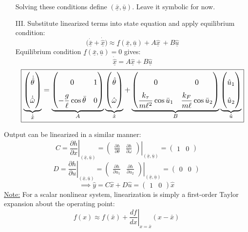 \documentclass[10pt, fleqn]{article}
\begin{document}
\begin{multicols*}{2}
\begin{itemize}
    Solving these conditions define $(\underline{\bar{x}}, \underline{\bar{u}})$. Leave it symbolic for now.
    \item [III.] Substitute linearized terms into state equation and apply equilibrium condition:
    \[\big(\underline{\dot{\bar{x}}}+\underline{\dot{\hat{x}}}\big)\approx \underline{f}(\underline{{\bar{x}}},\underline{\bar{u}})+ A \underline{\hat{x}}\ + B \underline{\hat{u}}\]
    Equilibrium condition $\underline{f}(\underline{{\bar{x}}},\underline{\bar{u}}) = 0$ gives:
    \[\underline{\dot{\hat{x}}} = A \underline{\hat{x}} + B \underline{\hat{u}}\]
\[
\resizebox{0.95\columnwidth}{!}{$\displaystyle
\renewcommand{\arraystretch}{2}
\boxed{
\underbrace{
\begin{pmatrix}
\dot{\hat{\theta}} \\
\dot{\hat{\omega}}
\end{pmatrix}
}_{\dot{\hat{x}}}
=
\underbrace{
\begin{pmatrix}
0 & 1 \\
-\dfrac{g}{\ell}\cos\bar{\theta} & 0
\end{pmatrix}
}_{A}
\underbrace{
\begin{pmatrix}
\hat{\theta} \\
\hat{\omega}
\end{pmatrix}
}_{\hat{x}}
+
\underbrace{
\begin{pmatrix}
0 & 0 \\
\dfrac{k_{\tau}}{m\ell^2}\cos\bar{u}_1 &
\dfrac{k_F}{m\ell}\cos\bar{u}_2
\end{pmatrix}
}_{B}
\underbrace{
\begin{pmatrix}
\hat{u}_1 \\
\hat{u}_2
\end{pmatrix}
}_{\hat{u}}
}
$}
\]
\end{itemize}
Output can be linearized in a similar manner:
\[
C = \left.\frac{\partial h}{\partial x}\right|_{(\underline{\bar{x}}, \underline{\bar{u}})}
=\left.\begin{pmatrix} \frac{\partial h}{\partial \theta} & \frac{\partial h}{\partial \omega} \end{pmatrix}\right|_{(\underline{\bar{x}}, \underline{\bar{u}})}
= \begin{pmatrix} 1 & 0 \end{pmatrix}
\]
\[
D = \left.\frac{\partial h}{\partial u}\right|_{(\underline{\bar{x}}, \underline{\bar{u}})}
=\left.\begin{pmatrix} \frac{\partial h}{\partial u_1} & \frac{\partial h}{\partial u_2} \end{pmatrix}\right|_{(\underline{\bar{x}}, \underline{\bar{u}})}
= \begin{pmatrix} 0 & 0 \end{pmatrix}
\]
\[
\implies \hat{y} = C\hat{x} + D\hat{u}
= \begin{pmatrix} 1 & 0 \end{pmatrix}\hat{x}
\]
\underline{Note:} For a scalar nonlinear system, linearization is simply a first-order Taylor expansion about the operating point:
\[
f(x)\approx f(\bar{x})+\left.\frac{df}{dx}\right|_{x=\bar{x}}(x-\bar{x})
\]
\newpage


\end{multicols*}
\end{document}
